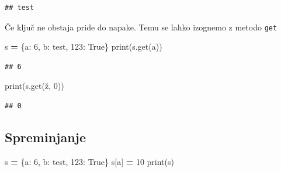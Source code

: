 \documentclass[
]{book}
\newenvironment{Shaded}{\begin{snugshade}}{\end{snugshade}}
\newcommand{\BuiltInTok}[1]{#1}
\newcommand{\DecValTok}[1]{\textcolor[rgb]{0.00,0.00,0.81}{#1}}
\newcommand{\NormalTok}[1]{#1}
\newcommand{\OperatorTok}[1]{\textcolor[rgb]{0.81,0.36,0.00}{\textbf{#1}}}
\newcommand{\StringTok}[1]{\textcolor[rgb]{0.31,0.60,0.02}{#1}}
\newcommand{\VariableTok}[1]{\textcolor[rgb]{0.00,0.00,0.00}{#1}}
\begin{document}
\begin{verbatim}
## test
\end{verbatim}

Če ključ ne obstaja pride do napake. Temu se lahko izognemo z metodo \texttt{get}

\begin{Shaded}
\begin{Highlighting}[]
\NormalTok{s }\OperatorTok{=}\NormalTok{ \{}\StringTok{\textquotesingle{}a\textquotesingle{}}\NormalTok{: }\DecValTok{6}\NormalTok{, }\StringTok{\textquotesingle{}b\textquotesingle{}}\NormalTok{: }\StringTok{\textquotesingle{}test\textquotesingle{}}\NormalTok{, }\DecValTok{123}\NormalTok{: }\VariableTok{True}\NormalTok{\}}
\BuiltInTok{print}\NormalTok{(s.get(}\StringTok{\textquotesingle{}a\textquotesingle{}}\NormalTok{))}
\end{Highlighting}
\end{Shaded}

\begin{verbatim}
## 6
\end{verbatim}

\begin{Shaded}
\begin{Highlighting}[]
\BuiltInTok{print}\NormalTok{(s.get(}\StringTok{\textquotesingle{}ž\textquotesingle{}}\NormalTok{, }\DecValTok{0}\NormalTok{))}
\end{Highlighting}
\end{Shaded}

\begin{verbatim}
## 0
\end{verbatim}

\hypertarget{spreminjanje-1}{%
\subsection{Spreminjanje}\label{spreminjanje-1}}

\begin{Shaded}
\begin{Highlighting}[]
\NormalTok{s }\OperatorTok{=}\NormalTok{ \{}\StringTok{\textquotesingle{}a\textquotesingle{}}\NormalTok{: }\DecValTok{6}\NormalTok{, }\StringTok{\textquotesingle{}b\textquotesingle{}}\NormalTok{: }\StringTok{\textquotesingle{}test\textquotesingle{}}\NormalTok{, }\DecValTok{123}\NormalTok{: }\VariableTok{True}\NormalTok{\}}
\NormalTok{s[}\StringTok{\textquotesingle{}a\textquotesingle{}}\NormalTok{] }\OperatorTok{=} \DecValTok{10}
\BuiltInTok{print}\NormalTok{(s)}
\end{Highlighting}
\end{Shaded}
\end{document}
